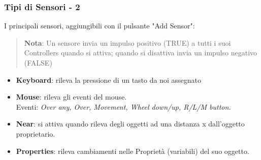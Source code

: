 \documentclass{beamer}
\begin{document}
		\begin{frame}
			\frametitle{Tipi di Sensori - 2}
			I principali sensori, aggiungibili con il pulsante "Add Sensor":
			\begin{quote}
			\textcolor{BlenderOrange}{\textbf{Nota}: Un sensore invia un impulso positivo (TRUE) a tutti i suoi Controllers quando si attiva; quando si disattiva invia un impulso negativo (FALSE)}
			\end{quote}
			\begin{itemize}
				\item \textbf{Keyboard}: rileva la pressione di un tasto da noi assegnato %
				\item \textbf{Mouse}: rileva gli eventi del mouse. \\ {\footnotesize\hspace{1em}Eventi: \textit{Over any, Over, Movement, Wheel down/up, R/L/M button.}}
				\item \textbf{Near}: si attiva quando rileva degli oggetti ad una distanza x dall'oggetto proprietario.
				\item \textbf{Properties}: rileva cambiamenti nelle Proprietà (variabili) del suo oggetto.
			\end{itemize}
		\end{frame}	
		
\end{document}
